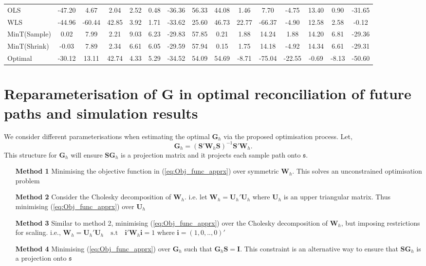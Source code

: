 \documentclass[12pt]{article}
\theoremstyle{definition}
\begin{document}
\begin{table}[H]
{\begin{tabular}{lcccccccccccccc}
			OLS & -47.20 & 4.67 & 2.04 & 2.52 & 0.48 & -36.36 & 56.33 & 44.08 & 1.46 & 7.70 & -4.75 & 13.40 & 0.90 & -31.65\\
			WLS & -44.96 & -60.44 & 42.85 & 3.92 & 1.71 & -33.62 & 25.60 & 46.73 & 22.77 & -66.37 & -4.90 & 12.58 & 2.58 & -0.12\\
			MinT(Sample) & 0.02 & 7.99 & 2.21 & 9.03 & 6.23 & -29.83 & 57.85 & 0.21 & 1.88 & 14.24 & 1.88 & 14.20 & 6.81 & -29.36\\
			MinT(Shrink) & -0.03 & 7.89 & 2.34 & 6.61 & 6.05 & -29.59 & 57.94 & 0.15 & 1.75 & 14.18 & -4.92 & 14.34 & 6.61 & -29.31\\
			Optimal & -30.12 & 13.11 & 42.74 & 4.33 & 5.29 & -34.52 & 54.09 & 54.69 & -8.71 & -75.04 & -22.55 & -0.69 & -8.13 & -50.60\\
			\bottomrule
		\end{tabular}
	}
\end{table}

\clearpage
\section{Reparameterisation of $\bm{G}$ in optimal reconciliation of future paths and simulation results} \label{app:ReparaG}

We consider different parameterisations when estimating the optimal $\bm{G}_h$ via the proposed optimisation process. Let,
\begin{equation}\label{eq:StructureofG}
\bm{G}_h = (\bm{S'W}_h\bm{S})^{-1}\bm{S'W}_h.
\end{equation}
This structure for $\bm{G}_h$ will ensure $\bm{SG}_h$ is a projection matrix and it projects each sample path onto $\mathfrak{s}$.
\begin{itemize}
	\item[\textbf{Method 1}] Minimising the objective function in (\ref{eq:Obj_func_apprx}) over symmetric $\bm{W}_h$. This solves an unconstrained optimisation problem
	\item[\textbf{Method 2}] Consider the Cholesky decomposition of $\bm{W}_h$. i.e. let $\bm{W}_h = \bm{U}_h'\bm{U}_h$ where $\bm{U}_h$ is an upper triangular matrix. Thus minimising (\ref{eq:Obj_func_apprx}) over $\bm{U}_h$
	\item[\textbf{Method 3}] Similar to method 2, minimising (\ref{eq:Obj_func_apprx}) over the Cholesky decomposition of $\bm{W}_h$, but imposing restrictions for scaling. i.e., $\bm{W}_h=\bm{U}_h'\bm{U}_h \quad \text{s.t} \quad \bm{i'}\bm{W}_h\bm{i}=1$ where $\bm{i}=(1,0,..,0)'$
	\item[\textbf{Method 4}] Minimising (\ref{eq:Obj_func_apprx}) over $\bm{G}_h$ such that $\bm{G}_h\bm{S}=\bm{I}$. This constraint is an alternative way to ensure that $\bm{SG}_h$ is a projection onto $\mathfrak{s}$
	
\end{itemize}
\end{document}
